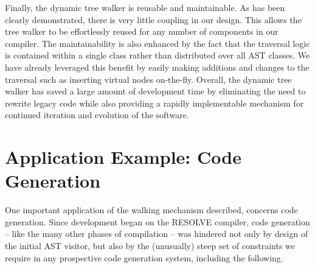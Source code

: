 \documentclass[times]{speauth}
\begin{document}
Finally, the dynamic tree walker is reusable and maintainable. As has been clearly demonstrated, there is very little coupling in our design. This allows the tree walker to be effortlessly reused for any number of components in our compiler. The maintainability is also enhanced by the fact that the traversal logic is contained within a single class rather than distributed over all AST classes. We have already leveraged this benefit by easily making additions and changes to the traversal such as inserting virtual nodes on-the-fly. Overall, the dynamic tree walker has saved a large amount of development time by eliminating the need to rewrite legacy code while also providing a rapidly implementable mechanism for continued iteration and evolution of the software.


\section{Application Example: Code Generation}
\vspace{-2pt}

One important application of the walking mechanism described, concerns code generation. Since development began on the RESOLVE compiler, code generation -- like the many other phases of compilation -- was hindered not only by design of the initial AST visitor, but also by the (unusually) steep set of constraints we require in any prospective code generation system, including the following.
\end{document}

